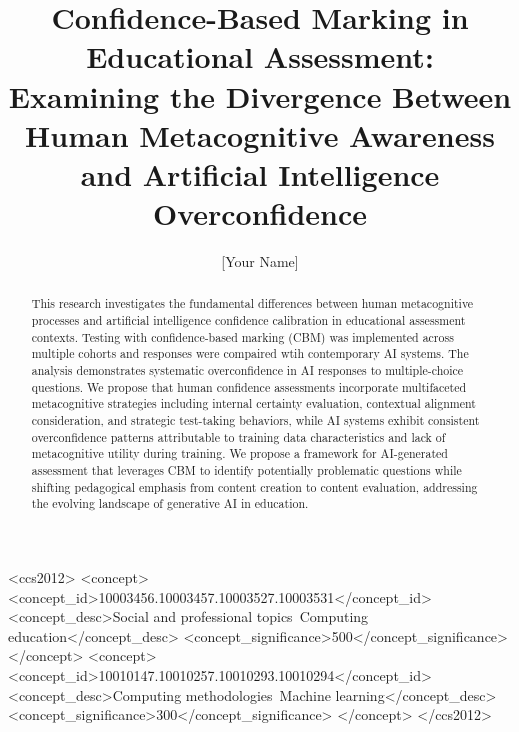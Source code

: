 \documentclass[sigconf]{acmart}
\begin{document}
\title{Confidence-Based Marking in Educational Assessment: Examining the Divergence Between Human Metacognitive Awareness and Artificial Intelligence Overconfidence}

\author{[Your Name]}

\begin{abstract}
This research investigates the fundamental differences between human metacognitive processes and artificial intelligence confidence calibration in educational assessment contexts. Testing with confidence-based marking (CBM) was implemented across multiple cohorts and responses were compaired wtih contemporary AI systems. The analysis demonstrates systematic overconfidence in AI responses to multiple-choice questions. We propose that human confidence assessments incorporate multifaceted metacognitive strategies including internal certainty evaluation, contextual alignment consideration, and strategic test-taking behaviors, while AI systems exhibit consistent overconfidence patterns attributable to training data characteristics and lack of metacognitive utility during training. We propose a framework for AI-generated assessment that leverages CBM to identify potentially problematic questions while shifting pedagogical emphasis from content creation to content evaluation, addressing the evolving landscape of generative AI in education.
\end{abstract}

\begin{CCSXML}
<ccs2012>
<concept>
<concept_id>10003456.10003457.10003527.10003531</concept_id>
<concept_desc>Social and professional topics~Computing education</concept_desc>
<concept_significance>500</concept_significance>
</concept>
<concept>
<concept_id>10010147.10010257.10010293.10010294</concept_id>
<concept_desc>Computing methodologies~Machine learning</concept_desc>
<concept_significance>300</concept_significance>
</concept>
</ccs2012>
\end{CCSXML}



\maketitle
\end{document}
